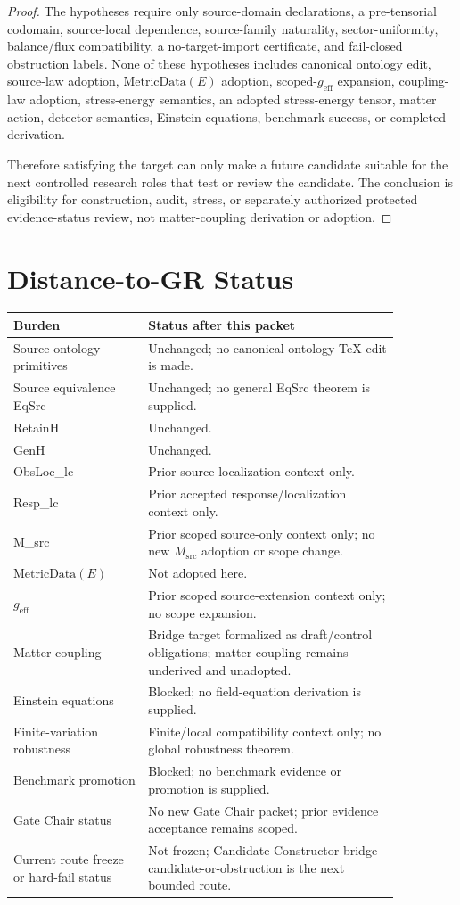 \documentclass[11pt]{article}
\newcommand{\MetricData}{\mathrm{MetricData}}
\newcommand{\geff}{g_{\mathrm{eff}}}
\newcommand{\Msrc}{M_{\mathrm{src}}}
\begin{document}
\begin{proof}
The hypotheses require only source-domain declarations, a pre-tensorial
codomain, source-local dependence, source-family naturality,
sector-uniformity, balance/flux compatibility, a no-target-import certificate,
and fail-closed obstruction labels. None of these hypotheses includes
canonical ontology edit, source-law adoption, \(\MetricData(E)\) adoption,
scoped-\(\geff\) expansion, coupling-law adoption, stress-energy semantics,
an adopted stress-energy tensor, matter action, detector semantics, Einstein
equations, benchmark success, or completed derivation.

Therefore satisfying the target can only make a future candidate suitable for
the next controlled research roles that test or review the candidate. The
conclusion is eligibility for construction, audit, stress, or separately
authorized protected evidence-status review, not matter-coupling derivation
or adoption.
\end{proof}

\section{Distance-to-GR Status}

\begin{longtable}{p{0.30\linewidth}p{0.56\linewidth}}
\toprule
Burden & Status after this packet \\
\midrule
Source ontology primitives & Unchanged; no canonical ontology TeX edit is made. \\
Source equivalence EqSrc & Unchanged; no general EqSrc theorem is supplied. \\
RetainH & Unchanged. \\
GenH & Unchanged. \\
ObsLoc_lc & Prior source-localization context only. \\
Resp_lc & Prior accepted response/localization context only. \\
M_src & Prior scoped source-only context only; no new \(\Msrc\) adoption or scope change. \\
\(\MetricData(E)\) & Not adopted here. \\
\(\geff\) & Prior scoped source-extension context only; no scope expansion. \\
Matter coupling & Bridge target formalized as draft/control obligations; matter coupling remains underived and unadopted. \\
Einstein equations & Blocked; no field-equation derivation is supplied. \\
Finite-variation robustness & Finite/local compatibility context only; no global robustness theorem. \\
Benchmark promotion & Blocked; no benchmark evidence or promotion is supplied. \\
Gate Chair status & No new Gate Chair packet; prior evidence acceptance remains scoped. \\
Current route freeze or hard-fail status & Not frozen; Candidate Constructor bridge candidate-or-obstruction is the next bounded route. \\
\bottomrule
\end{longtable}
\end{document}
